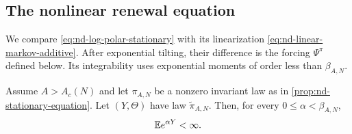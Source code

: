 \documentclass[11pt,reqno,a4paper]{article}
\newcommand{\Ee}{\E}
\begin{document}
\subsection{The nonlinear renewal equation}
\label{subsec:nd-nonlinear-renewal}

We compare \cref{eq:nd-log-polar-stationary} with its linearization
\cref{eq:nd-linear-markov-additive}. After exponential tilting, their
difference is the forcing $\Psi^\pi$ defined below. Its integrability uses
exponential moments of order less than $\beta_{A,N}$.
\begin{lemma}
\label{lem:nd-subcritical-exponential-moments}
  Assume $A>A_c(N)$ and let $\pi_{A,N}$ be a nonzero invariant law as in
  \cref{prop:nd-stationary-equation}. Let $(Y,\Theta)$ have law
  $\widetilde{\pi}_{A,N}$. Then, for every $0\leq\alpha<\beta_{A,N}$,
  \begin{equation}\label{eq:nd-subcritical-exponential-moment}
    \Ee e^{\alpha Y}<\infty .
  \end{equation}
\end{lemma}
\end{document}
